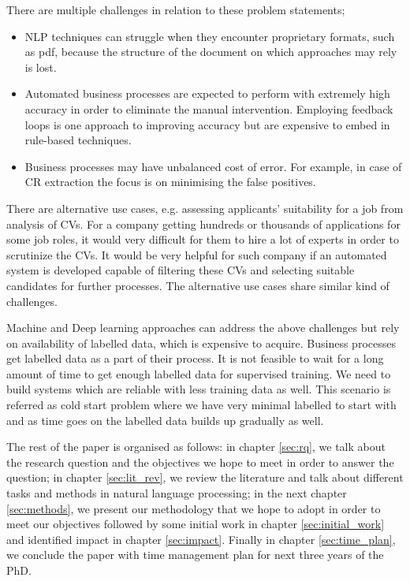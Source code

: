 There are multiple challenges in relation to these problem statements;



\begin{itemize}
    \item NLP techniques can struggle when they encounter proprietary formats, such as pdf, because the structure of the document on which approaches may rely is lost.
    \item Automated business processes are expected to perform with extremely high accuracy in order to eliminate the manual intervention. Employing feedback loops is one approach to improving accuracy but are expensive to embed in rule-based techniques.
    \item Business processes may have unbalanced cost of error. For example, in case of CR extraction the focus is on minimising the false positives.
\end{itemize}

There are alternative use cases, e.g. assessing applicants’ suitability for a job from analysis of CVs. For a company getting hundreds or thousands of applications for some job roles, it would very difficult for them to hire a lot of experts in order to scrutinize the CVs. It would be very helpful for such company if an automated system is developed capable of filtering these CVs and selecting suitable candidates for further processes. The alternative use cases share similar kind of challenges.

Machine and Deep learning approaches can address the above challenges but rely on availability of labelled data, which is expensive to acquire. Business processes get labelled data as a part of their process. It is not feasible to wait for a long amount of time to get enough labelled data for supervised training. We need to build systems which are reliable with less training data as well. This scenario is referred as cold start problem where we have very minimal labelled to start with and as time goes on the labelled data builds up gradually as well.

The rest of the paper is organised as follows: in chapter \ref{sec:rq}, we talk about the research question and the objectives we hope to meet in order to answer the question; in chapter \ref{sec:lit_rev}, we review the literature and talk about different tasks and methods in natural language processing; in the next chapter \ref{sec:methods}, we present our methodology that we hope to adopt in order to meet our objectives followed by some initial work in chapter \ref{sec:initial_work} and identified impact in chapter \ref{sec:impact}. Finally in chapter \ref{sec:time_plan}, we conclude the paper with time management plan for next three years of the PhD.